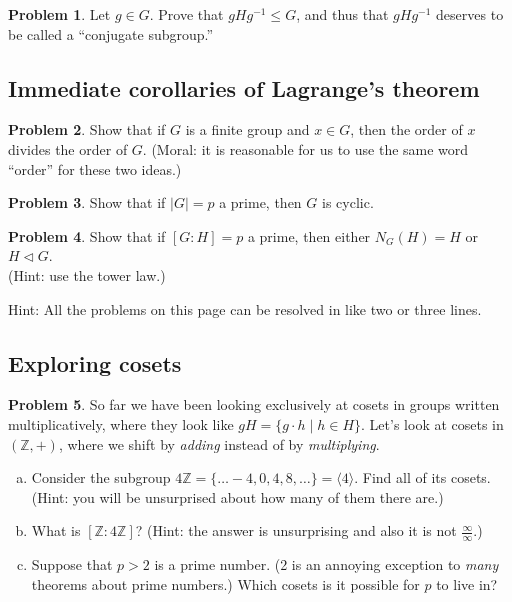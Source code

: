 \documentclass[12pt]{article}
\theoremstyle{definition} %
\newtheorem{problem}{Problem}
\newcommand{\Balert}[1]{\textcolor{xBlue}{#1}}
\newcommand{\Z}{\mathbb{Z}}
\newcommand\inv{^{-1}} %
\def\<{\langle}
\def\>{\rangle}
\def\normal{\lhd}
\begin{document}
\begin{problem}
    Let $g\in G$. Prove that $gHg\inv \leq G$, and thus that $gHg\inv$ deserves to be called a ``conjugate \Balert{subgroup}.''
\end{problem}

\subsection*{Immediate corollaries of Lagrange's theorem}

\begin{problem}
    Show that if $G$ is a finite group and $x\in G$, then the order of $x$ divides the order of $G$. (Moral: it is reasonable for us to use the same word ``order'' for these two ideas.)
\end{problem}

\begin{problem}
    Show that if $|G| = p$ a prime, then $G$ is cyclic.
\end{problem}

\begin{problem}
    Show that if $[G:H] = p$ a prime, then either $N_G(H) = H$ or $H \normal G$. \\(Hint: use the tower law.)
\end{problem}

\vfill

Hint: All the problems on this page can be resolved in like two or three lines.

\pagebreak
\subsection*{Exploring cosets}

\begin{problem}\label{4Z}
    So far we have been looking exclusively at cosets in groups written multiplicatively, where they look like $gH = \{g\cdot h \mid h\in H\}$. Let's look at cosets in $(\Z, +)$, where we shift by \textit{adding} instead of by \textit{multiplying}.
    \begin{enumerate}[(a)]
        \item Consider the subgroup $4\Z = \{\ldots -4, 0, 4, 8, \ldots\} = \<4\>$. Find all of its cosets. \\
        (Hint: you will be unsurprised about how many of them there are.)
        \item What is $[\Z:4\Z]$? (Hint: the answer is unsurprising and also it is not $\frac{\infty}{\infty}$.)
        \item Suppose that $p > 2$ is a prime number. (2 is an annoying exception to \textit{many} theorems about prime numbers.) Which cosets is it possible for $p$ to live in?
    \end{enumerate}
\end{problem}
\end{document}
